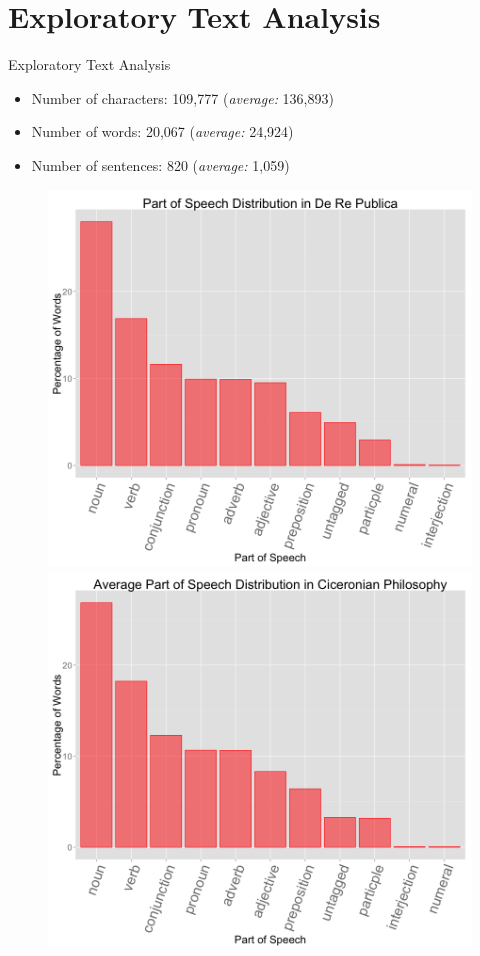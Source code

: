 \documentclass{beamer}
\begin{document}
\section{Exploratory Text Analysis}
\begin{frame}{Exploratory Text Analysis}
\begin{itemize}
	\item Number of characters: 109,777 \tab (\textit{average:} 136,893)
	\item Number of words: 20,067 \tab (\textit{average:} 24,924)
	\item Number of sentences: 820 \tab (\textit{average:} 1,059)
\end{itemize}

\begin{figure}
	\centering
	\begin{minipage}{.5\textwidth}
		\centering
		\includegraphics[scale=0.19]{fig1.png}
	\end{minipage}%
	\begin{minipage}{.5\textwidth}
		\centering
		\includegraphics[scale=0.19]{fig2.png}

\end{minipage}
\end{figure}
\end{frame}
\end{document}
